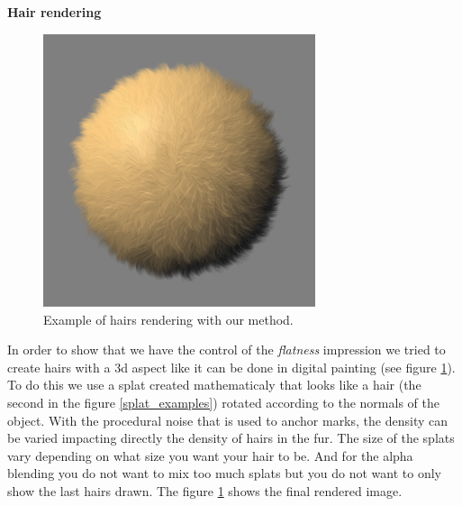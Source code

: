 \textbf{Hair rendering}

\begin{figure}
    \begin{center}
    \includegraphics[width=80mm, height=80mm]{Resultats/bouledepoil1/final.png}
    \end{center}
    \caption{Example of hairs rendering with our method.}
    \label{final_hair}
\end{figure}

In order to show that we have the control of the \textit{flatness} impression we tried to create hairs with a 3d aspect like it can be done in digital painting (see figure \ref{final_hair}). To do this we use a splat created mathematicaly that looks like a hair (the second in the figure \ref{splat_examples}) rotated according to the normals of the object. With the procedural noise that is used to anchor marks, the density can be varied impacting directly the density of hairs in the fur. The size of the splats vary depending on what size you want your hair to be. And for the alpha blending you do not want to mix too much splats but you do not want to only show the last hairs drawn. The figure \ref{final_hair} shows the final rendered image.
